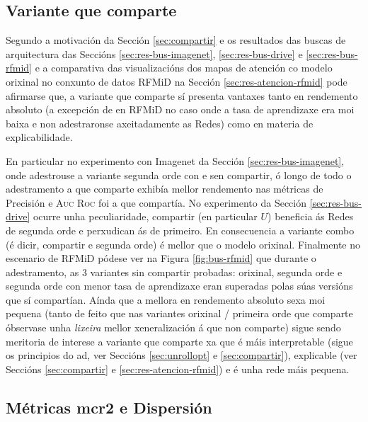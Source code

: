 \subsection{Variante que comparte}
\label{sec:con-compartir}

Segundo a motivación da Sección \ref{sec:compartir} e os resultados das buscas de arquitectura das Seccións \ref{sec:res-bus-imagenet}, \ref{sec:res-bus-drive} e \ref{sec:res-bus-rfmid} e a comparativa das visualizacións dos mapas de atención co modelo orixinal no conxunto de datos RFMiD na Sección \ref{sec:res-atencion-rfmid} pode afirmarse que, a variante que comparte sí presenta vantaxes tanto en rendemento absoluto (a excepción de en RFMiD no caso onde a \gls{tasa de aprendizaxe} era moi baixa e non adestraronse axeitadamente as Redes) como en materia de \gls{explicabilidade}.

En particular no experimento con Imagenet da Sección \ref{sec:res-bus-imagenet}, onde adestrouse a variante segunda orde con e sen compartir, ó longo de todo o adestramento a que comparte exhibía mellor rendemento nas métricas de Precisión e \textsc{Auc Roc} foi a que compartía. No experimento da Sección \ref{sec:res-bus-drive} ocurre unha peculiaridade, compartir (en particular $U$) beneficia ás Redes de segunda orde e perxudican ás de primeiro. En consecuencia a variante combo (é dicir, compartir e segunda orde) é mellor que o modelo orixinal. Finalmente no escenario de RFMiD pódese ver na Figura \ref{fig:bus-rfmid} que durante o adestramento, as 3 variantes sin compartir probadas: orixinal, segunda orde e segunda orde con menor tasa de aprendizaxe eran superadas polas súas versións que sí compartían. Aínda que a mellora en rendemento absoluto sexa moi pequena (tanto de feito que nas variantes orixinal / primeira orde que comparte óbservase unha \emph{lixeira} mellor xeneralización á que non comparte) sigue sendo meritoria de interese a variante que comparte xa que é máis interpretable (sigue os principios do \acrshort{ad}, ver Seccións \ref{sec:unrollopt} e \ref{sec:compartir}), explicable (ver Seccións \ref{sec:compartir} e \ref{sec:res-atencion-rfmid}) e é unha rede máis pequena.

\subsection{Métricas \acrshort{mcr2} e Dispersión}

